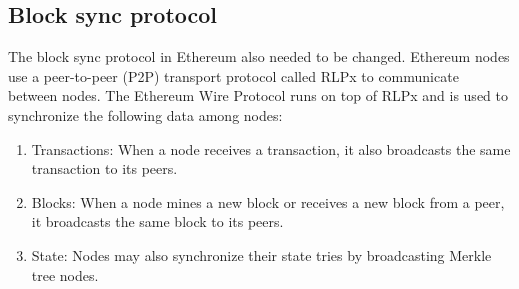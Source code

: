 \documentclass[12pt]{article}
\newcounter{protocol}
\begin{document}
\subsection{Block sync protocol}

The block sync protocol in Ethereum also needed to be changed. Ethereum nodes use a peer-to-peer (P2P) transport protocol called RLPx to communicate between nodes. The Ethereum Wire Protocol runs on top of RLPx and is used to synchronize the following data among nodes:
\begin{enumerate}
  \item Transactions: When a node receives a transaction, it also broadcasts the same transaction to its peers.
  \item Blocks: When a node mines a new block or receives a new block from a peer, it broadcasts the same block to its peers.
  \item State: Nodes may also synchronize their state tries by broadcasting Merkle tree nodes.
\end{enumerate}
\end{document}
